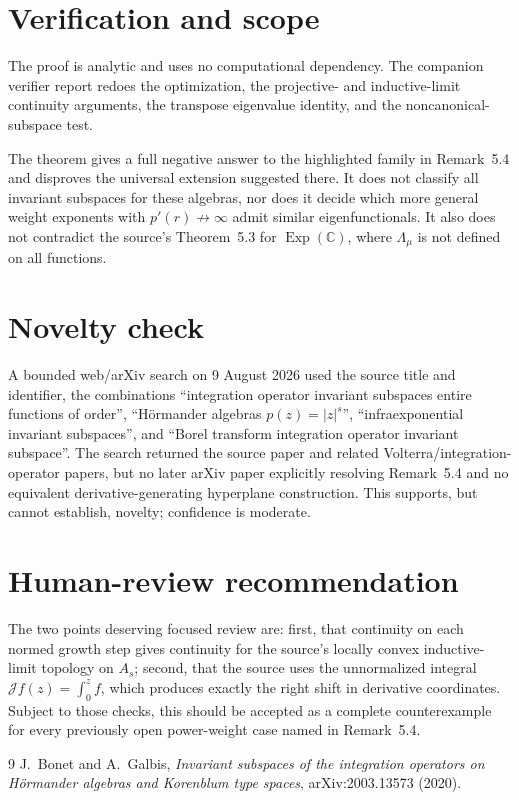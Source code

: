 \documentclass[11pt]{article}
\newcommand{\C}{\mathbb C}
\newcommand{\J}{\mathcal J}
\newcommand{\Lam}{\Lambda}
\begin{document}
\section{Verification and scope}

The proof is analytic and uses no computational dependency. The companion verifier report redoes the optimization, the projective- and inductive-limit continuity arguments, the transpose eigenvalue identity, and the noncanonical-subspace test.

The theorem gives a full negative answer to the highlighted family in Remark~5.4 and disproves the universal extension suggested there. It does not classify all invariant subspaces for these algebras, nor does it decide which more general weight exponents with $p'(r)\not\to\infty$ admit similar eigenfunctionals. It also does not contradict the source's Theorem~5.3 for $\operatorname{Exp}(\C)$, where $\Lam_\mu$ is not defined on all functions.

\section{Novelty check}

A bounded web/arXiv search on 9 August 2026 used the source title and identifier, the combinations ``integration operator invariant subspaces entire functions of order'', ``H\"ormander algebras $p(z)=|z|^s$'', ``infraexponential invariant subspaces'', and ``Borel transform integration operator invariant subspace''. The search returned the source paper and related Volterra/integration-operator papers, but no later arXiv paper explicitly resolving Remark~5.4 and no equivalent derivative-generating hyperplane construction. This supports, but cannot establish, novelty; confidence is moderate.

\section{Human-review recommendation}

The two points deserving focused review are: first, that continuity on each normed growth step gives continuity for the source's locally convex inductive-limit topology on $A_s$; second, that the source uses the unnormalized integral $\J f(z)=\int_0^z f$, which produces exactly the right shift in derivative coordinates. Subject to those checks, this should be accepted as a complete counterexample for every previously open power-weight case named in Remark~5.4.

\begin{thebibliography}{9}
J.~Bonet and A.~Galbis,
\emph{Invariant subspaces of the integration operators on H\"ormander algebras and Korenblum type spaces},
arXiv:2003.13573 (2020).
\end{thebibliography}
\end{document}
